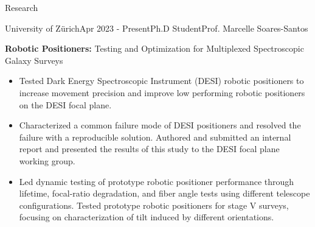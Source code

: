 \documentclass{resume} %
\begin{document}
\begin{rSection}{Research}
\begin{rSubsection}{University of Zürich}{Apr 2023 - Present}{Ph.D Student}{Prof. Marcelle Soares-Santos}
    \item \textbf{Robotic Positioners:} Testing and Optimization for Multiplexed Spectroscopic Galaxy Surveys
    \begin{itemize}
        \item Tested Dark Energy Spectroscopic Instrument (DESI) robotic positioners to increase movement precision and improve low performing robotic positioners on the DESI focal plane. 
        \item Characterized a common failure mode of DESI positioners and resolved the failure with a reproducible solution. Authored and submitted an internal report and presented the results of this study to the DESI focal plane working group. 
        \item Led dynamic testing of prototype robotic positioner performance through lifetime, focal-ratio degradation, and fiber angle tests using different telescope configurations. Tested prototype robotic positioners for stage V surveys, focusing on characterization of tilt induced by different orientations.
    \end{itemize}
\end{rSubsection}




\end{rSection}
\end{document}
